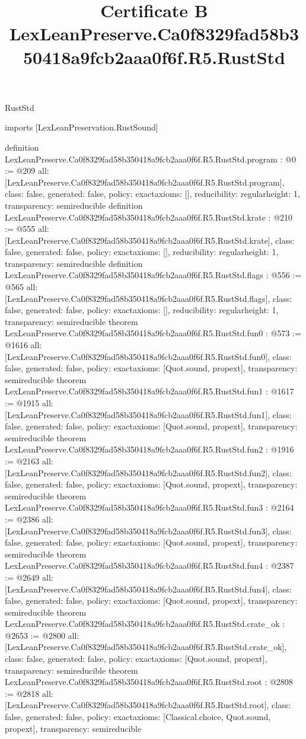 \begin{lexlean}{RustStd}
\title{Certificate B LexLeanPreserve.Ca0f8329fad58b350418a9fcb2aaa0f6f.R5.RustStd}
\begin{coremodule}
imports [LexLeanPreservation.RustSound]

definition LexLeanPreserve.Ca0f8329fad58b350418a9fcb2aaa0f6f.R5.RustStd.program : @0 := @209 {
  all: [LexLeanPreserve.Ca0f8329fad58b350418a9fcb2aaa0f6f.R5.RustStd.program],
  class: false,
  generated: false,
  policy: exact{axioms: []},
  reducibility: regular{height: 1},
  transparency: semireducible
}
definition LexLeanPreserve.Ca0f8329fad58b350418a9fcb2aaa0f6f.R5.RustStd.krate : @210 := @555 {
  all: [LexLeanPreserve.Ca0f8329fad58b350418a9fcb2aaa0f6f.R5.RustStd.krate],
  class: false,
  generated: false,
  policy: exact{axioms: []},
  reducibility: regular{height: 1},
  transparency: semireducible
}
definition LexLeanPreserve.Ca0f8329fad58b350418a9fcb2aaa0f6f.R5.RustStd.flags : @556 := @565 {
  all: [LexLeanPreserve.Ca0f8329fad58b350418a9fcb2aaa0f6f.R5.RustStd.flags],
  class: false,
  generated: false,
  policy: exact{axioms: []},
  reducibility: regular{height: 1},
  transparency: semireducible
}
theorem LexLeanPreserve.Ca0f8329fad58b350418a9fcb2aaa0f6f.R5.RustStd.fun0 : @573 := @1616 {
  all: [LexLeanPreserve.Ca0f8329fad58b350418a9fcb2aaa0f6f.R5.RustStd.fun0],
  class: false,
  generated: false,
  policy: exact{axioms: [Quot.sound, propext]},
  transparency: semireducible
}
theorem LexLeanPreserve.Ca0f8329fad58b350418a9fcb2aaa0f6f.R5.RustStd.fun1 : @1617 := @1915 {
  all: [LexLeanPreserve.Ca0f8329fad58b350418a9fcb2aaa0f6f.R5.RustStd.fun1],
  class: false,
  generated: false,
  policy: exact{axioms: [Quot.sound, propext]},
  transparency: semireducible
}
theorem LexLeanPreserve.Ca0f8329fad58b350418a9fcb2aaa0f6f.R5.RustStd.fun2 : @1916 := @2163 {
  all: [LexLeanPreserve.Ca0f8329fad58b350418a9fcb2aaa0f6f.R5.RustStd.fun2],
  class: false,
  generated: false,
  policy: exact{axioms: [Quot.sound, propext]},
  transparency: semireducible
}
theorem LexLeanPreserve.Ca0f8329fad58b350418a9fcb2aaa0f6f.R5.RustStd.fun3 : @2164 := @2386 {
  all: [LexLeanPreserve.Ca0f8329fad58b350418a9fcb2aaa0f6f.R5.RustStd.fun3],
  class: false,
  generated: false,
  policy: exact{axioms: [Quot.sound, propext]},
  transparency: semireducible
}
theorem LexLeanPreserve.Ca0f8329fad58b350418a9fcb2aaa0f6f.R5.RustStd.fun4 : @2387 := @2649 {
  all: [LexLeanPreserve.Ca0f8329fad58b350418a9fcb2aaa0f6f.R5.RustStd.fun4],
  class: false,
  generated: false,
  policy: exact{axioms: [Quot.sound, propext]},
  transparency: semireducible
}
theorem LexLeanPreserve.Ca0f8329fad58b350418a9fcb2aaa0f6f.R5.RustStd.crate_ok : @2653 := @2800 {
  all: [LexLeanPreserve.Ca0f8329fad58b350418a9fcb2aaa0f6f.R5.RustStd.crate_ok],
  class: false,
  generated: false,
  policy: exact{axioms: [Quot.sound, propext]},
  transparency: semireducible
}
theorem LexLeanPreserve.Ca0f8329fad58b350418a9fcb2aaa0f6f.R5.RustStd.root : @2808 := @2818 {
  all: [LexLeanPreserve.Ca0f8329fad58b350418a9fcb2aaa0f6f.R5.RustStd.root],
  class: false,
  generated: false,
  policy: exact{axioms: [Classical.choice, Quot.sound, propext]},
  transparency: semireducible
}


\end{coremodule}
\end{lexlean}
